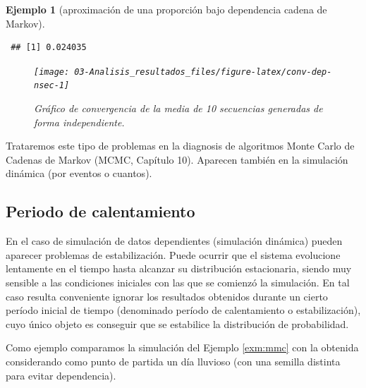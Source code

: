 \documentclass[
  10pt,
]{book}
\theoremstyle{break}
\newtheorem{example}{Ejemplo}[chapter]
\theoremstyle{nonumberplain}
\begin{document}
\begin{example}[aproximación de una proporción bajo dependencia cadena de Markov]
\begin{verbatim}
 ## [1] 0.024035
\end{verbatim}

\begin{figure}[!htbp]

{\centering \texttt{[image: 03-Analisis\_resultados\_files/figure-latex/conv-dep-nsec-1]} 

}

\caption{Gráfico de convergencia de la media de 10 secuencias generadas de forma independiente.}\label{fig:conv-dep-nsec}
\end{figure}

\end{example}

Trataremos este tipo de problemas en la diagnosis de algoritmos Monte Carlo de Cadenas de Markov (MCMC, Capítulo 10).
Aparecen también en la simulación dinámica (por eventos o cuantos).

\hypertarget{periodo-de-calentamiento}{%
\subsection{Periodo de calentamiento}\label{periodo-de-calentamiento}}

En el caso de simulación de datos dependientes (simulación dinámica)
pueden aparecer problemas de estabilización. Puede ocurrir que el sistema
evolucione lentamente en el tiempo hasta alcanzar su distribución estacionaria,
siendo muy sensible a las condiciones iniciales con las que se comienzó la
simulación. En tal caso resulta conveniente ignorar los resultados obtenidos
durante un cierto período inicial de tiempo (denominado período de calentamiento
o estabilización), cuyo único objeto es conseguir que se estabilice la distribución de
probabilidad.

Como ejemplo comparamos la simulación del Ejemplo \ref{exm:mmc} con la obtenida considerando como punto de partida un día lluvioso (con una semilla distinta para evitar dependencia).
\end{document}
